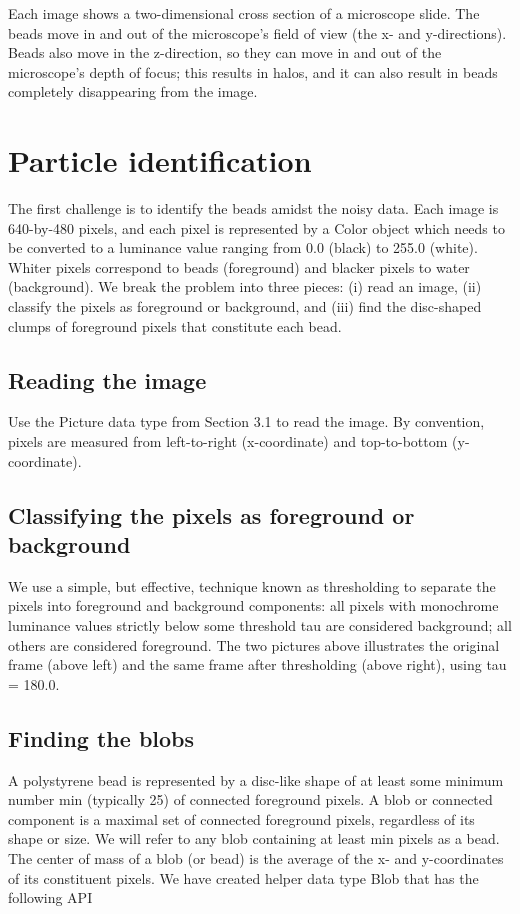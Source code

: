\documentclass[]{article}
\begin{document}
Each image shows a two-dimensional cross section of a microscope slide. The beads move in and out of the microscope's field of view (the x- and y-directions). Beads also move in the z-direction, so they can move in and out of the microscope's depth of focus; this results in halos, and it can also result in beads completely disappearing from the image.

\section{Particle identification}
The first challenge is to identify the beads amidst the noisy data. Each image is 640-by-480 pixels, and each pixel is represented by a Color object which needs to be converted to a luminance value ranging from 0.0 (black) to 255.0 (white). Whiter pixels correspond to beads (foreground) and blacker pixels to water (background). We break the problem into three pieces: (i) read an image, (ii) classify the pixels as foreground or background, and (iii) find the disc-shaped clumps of foreground pixels that constitute each bead.

\subsection{Reading the image}
Use the Picture data type from Section 3.1 to read the image. By convention, pixels are measured from left-to-right (x-coordinate) and top-to-bottom (y-coordinate).

\subsection{Classifying the pixels as foreground or background}
We use a simple, but effective, technique known as thresholding to separate the pixels into foreground and background components: all pixels with monochrome luminance values strictly below some threshold tau are considered background; all others are considered foreground. The two pictures above illustrates the original frame (above left) and the same frame after thresholding (above right), using tau = 180.0.

\subsection{Finding the blobs}
A polystyrene bead is represented by a disc-like shape of at least some minimum number min (typically 25) of connected foreground pixels. A blob or connected component is a maximal set of connected foreground pixels, regardless of its shape or size. We will refer to any blob containing at least min pixels as a bead. The center of mass of a blob (or bead) is the average of the x- and y-coordinates of its constituent pixels.
We have created helper data type Blob that has the following API
\end{document}
